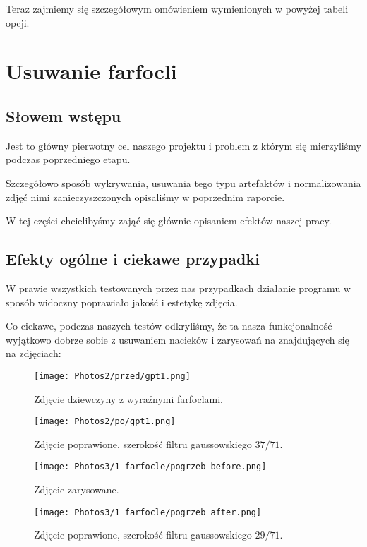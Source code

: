 \documentclass[]{mwart}
\begin{document}
Teraz zajmiemy się szczegółowym omówieniem wymienionych w powyżej tabeli opcji. \newpage






\section{Usuwanie farfocli}

\subsection{Słowem wstępu}
Jest to główny pierwotny cel naszego projektu i problem z którym się mierzyliśmy podczas poprzedniego etapu.

Szczegółowo sposób wykrywania, usuwania tego typu artefaktów i normalizowania
zdjęć nimi zanieczyszczonych opisaliśmy w poprzednim raporcie.

W tej części chcielibyśmy zająć się głównie opisaniem efektów naszej pracy.

\subsection{Efekty ogólne i ciekawe przypadki}
W prawie wszystkich testowanych przez nas przypadkach działanie programu w sposób widoczny poprawiało jakość i estetykę zdjęcia.

Co ciekawe, podczas naszych testów odkryliśmy, że ta nasza funkcjonalność
wyjątkowo dobrze sobie z usuwaniem nacieków i zarysowań na znajdujących się na zdjęciach:

\begin{figure}[H]
    \centering
    \texttt{[image: Photos2/przed/gpt1.png]}
    \caption{Zdjęcie dziewczyny z wyraźnymi farfoclami.}
\end{figure}
\begin{figure}[H]
    \centering
    \texttt{[image: Photos2/po/gpt1.png]}
    \caption{Zdjęcie poprawione, szerokość filtru gaussowskiego $37/71$.}
\end{figure}

\begin{figure}[H]
    \centering
    \texttt{[image: Photos3/1 farfocle/pogrzeb\_before.png]}
    \caption{Zdjęcie zarysowane.}
\end{figure}
\begin{figure}[H]
    \centering
    \texttt{[image: Photos3/1 farfocle/pogrzeb\_after.png]}
    \caption{Zdjęcie poprawione, szerokość filtru gaussowskiego $29/71$.}
\end{figure}
\end{document}
